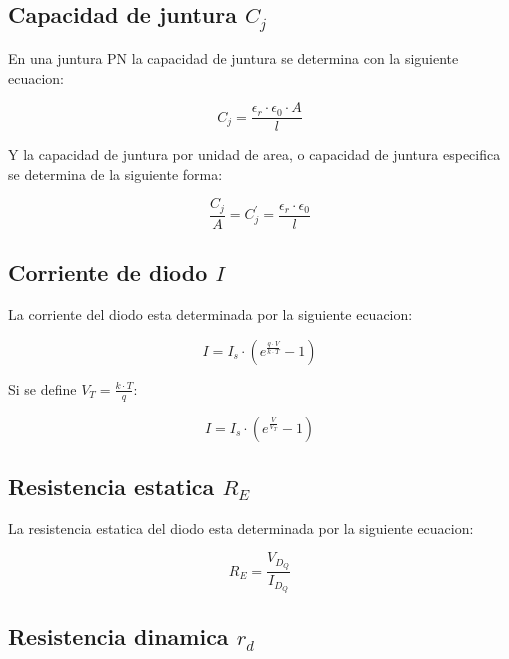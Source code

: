 \documentclass[../main.tex]{subfiles}
\begin{document}
	\subsection{Capacidad de juntura $C_j$}
	
	En una juntura PN la capacidad de juntura se determina con la siguiente ecuacion:
	
	\begin{equation}
		C_j = \frac{\epsilon_r \cdot \epsilon_0 \cdot A}{l}
	\end{equation}
	
	Y la capacidad de juntura por unidad de area, o capacidad de juntura especifica se determina de la siguiente forma:
	
	\begin{equation}
		\frac{C_j}{A} = C^{'}_j = \frac{\epsilon_r \cdot \epsilon_0}{l}
	\end{equation}
	
	\subsection{Corriente de diodo $I$}
	
	La corriente del diodo esta determinada por la siguiente ecuacion:
	
	\Large
	\begin{equation}
		I = I_s \cdot \left( e^{\frac{q \cdot V}{k \cdot T}} - 1\right) 
	\end{equation}
	
	\normalsize
	Si se define $V_T = \frac{k \cdot T}{q}$:
	
	\Large
	\begin{equation}
		I = I_s \cdot \left( e^{\frac{V}{V_T}} - 1\right) 
	\end{equation}
	
	\normalsize
	\subsection{Resistencia estatica $R_E$}
	
	La resistencia estatica del diodo esta determinada por la siguiente ecuacion:
	
	\begin{equation}
		R_E = \frac{V_{D_Q}}{I_{D_Q}} 
	\end{equation}
	
	\normalsize
	\subsection{Resistencia dinamica $r_d$}
	
\end{document}
